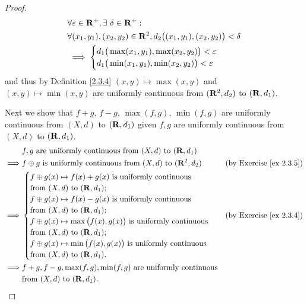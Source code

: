 \begin{proof}
\begin{align*}
         & \forall \varepsilon \in \mathbf{R}^+, \exists\ \delta \in \mathbf{R}^+ :                              \\
         & \forall (x_1, y_1), (x_2, y_2) \in \mathbf{R}^2, d_2\big((x_1, y_1), (x_2, y_2)\big) < \delta \\
         & \implies \begin{cases}
                        d_1\big(\max(x_1, y_1), \max(x_2, y_2)\big) < \varepsilon \\
                        d_1\big(\min(x_1, y_1), \min(x_2, y_2)\big) < \varepsilon
                    \end{cases}
    \end{align*}
    and thus by Definition \ref{2.3.4} \((x, y) \mapsto \max(x, y)\) and \((x, y) \mapsto \min(x, y)\) are uniformly continuous from \((\mathbf{R}^2, d_2)\) to \((\mathbf{R}, d_1)\).

    Next we show that \(f + g\), \(f - g\), \(\max(f, g)\), \(\min(f, g)\) are uniformly continuous from \((X, d)\) to \((\mathbf{R}, d_1)\) given \(f, g\) are uniformly continuous from \((X, d)\) to \((\mathbf{R}, d_1)\).
    \begin{align*}
                 & f, g \text{ are uniformly continuous from } (X, d) \text{ to } (\mathbf{R}, d_1)                                                \\
        \implies & f \oplus g \text{ is uniformly continuous from } (X, d) \text{ to } (\mathbf{R}^2, d_2)   & \text{(by Exercise \ref{ex 2.3.5})} \\
        \implies & \begin{cases}
                       f \oplus g(x) \mapsto f(x) + g(x) \text{ is uniformly continuous}              \\
                       \text{from } (X, d) \text{ to } (\mathbf{R}, d_1);                                     \\
                       f \oplus g(x) \mapsto f(x) - g(x) \text{ is uniformly continuous}              \\
                       \text{from } (X, d) \text{ to } (\mathbf{R}, d_1);                                     \\
                       f \oplus g(x) \mapsto \max\big(f(x), g(x)\big) \text{ is uniformly continuous} \\
                       \text{from } (X, d) \text{ to } (\mathbf{R}, d_1);                                     \\
                       f \oplus g(x) \mapsto \min\big(f(x), g(x)\big) \text{ is uniformly continuous} \\
                       \text{from } (X, d) \text{ to } (\mathbf{R}, d_1).
                   \end{cases} & \text{(by Exercise \ref{ex 2.3.4})}                                          \\
        \implies & f + g, f - g, \max(f, g), \min(f, g) \text{ are uniformly continuous}                                                   \\
                 & \text{from } (X, d) \text{ to } (\mathbf{R}, d_1).
    \end{align*}


\end{proof}
